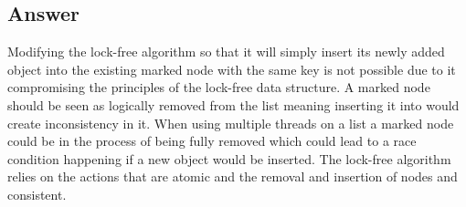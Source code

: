 \documentclass{article}
\begin{document}
\subsection*{Answer}
Modifying the lock-free algorithm so that it will simply insert its newly added object into the existing marked node with the same key is not possible due to it compromising the principles of the lock-free data structure. A marked node should be seen as logically removed from the list meaning inserting it into would create inconsistency in it. When using multiple threads on a list a marked node could be in the process of being fully removed which could lead to a race condition happening if a new object would be inserted. The lock-free algorithm relies on the actions that are atomic and the removal and insertion of nodes and consistent.

\newpage
\printbibliography
\end{document}
